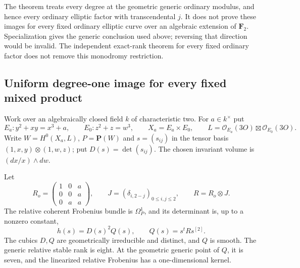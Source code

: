 \begin{remark}
\label{rem:generic-mixed-modulus-gate}
The theorem treats every degree at the geometric generic
ordinary modulus, and hence every ordinary elliptic factor
with transcendental $j$. It does not prove these images for
every fixed ordinary elliptic curve over an algebraic extension
of $\mathbf F_2$. Specialization gives the generic conclusion
used above; reversing that direction would be invalid.
The independent exact-rank theorem for every fixed ordinary
factor does not remove this monodromy restriction.
\end{remark}


\subsection{Uniform degree-one image for every fixed mixed product}
\label{subsec:mixed-uniform-degree-one-inertia-candidate}

Work over an algebraically closed field $k$ of characteristic two. For
$a\in k^\times$ put
\[
 E_a:y^2+xy=x^3+a,\qquad E_0:z^2+z=w^3,
 \qquad X_a=E_a\times E_0,
 \qquad L=\mathcal O_{E_a}(3O)\boxtimes\mathcal O_{E_0}(3O).
\]
Write $W=H^0(X_a,L)$, $P=\mathbf P(W)$ and $s=(s_{ij})$ in
the tensor basis $(1,x,y)\otimes(1,w,z)$; put $D(s)=\det(s_{ij})$.
The chosen invariant volume is $(dx/x)\wedge dw$.

\begin{proposition}
\label{prop:mixed-uniform-degree-one-Hasse-candidate}
Let
\[
 R_o=\begin{pmatrix}1&0&a\\0&0&a\\0&a&a\end{pmatrix},
 \qquad J=(\delta_{i,2-j})_{0\le i,j\le2},
 \qquad R=R_o\otimes J.
\]
The relative coherent Frobenius bundle is $\Omega_P^1$, and its
determinant is, up to a nonzero constant,
\[
                   h(s)=D(s)^2Q(s),\qquad Q(s)=s^tRs^{[2]}.
\]
The cubics $D,Q$ are geometrically irreducible and distinct, and
$Q$ is smooth. The generic relative stable rank is eight. At the
geometric generic point of $Q$, it is seven, and the linearized
relative Frobenius has a one-dimensional kernel.
\end{proposition}

